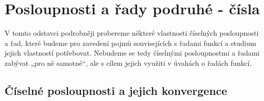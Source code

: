  \section{Posloupnosti a řady podruhé - čísla}\label{mai:IIchapVsecI}
    V tomto odstavci podrobněji probereme některé vlastnosti číselných posloupnosti a řad, které
    budeme pro zavedení pojmů souvisejících s řadami funkcí a studium jejich vlastností potřebovat.
    Nebudeme se tedy číselnými posloupnostmi a řadami zabývat „pro ně samotné“, ale s cílem jejich
    využití v úvahách o řadách funkcí.

    \subsection{Číselné posloupnosti a jejich konvergence}\label{mai:IIchapVsecIssecI}

